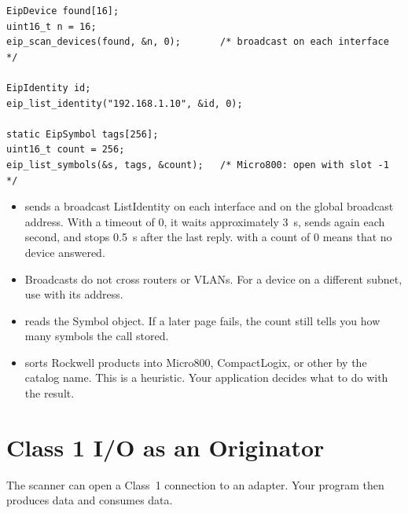 \begin{lstlisting}
EipDevice found[16];
uint16_t n = 16;
eip_scan_devices(found, &n, 0);       /* broadcast on each interface */

EipIdentity id;
eip_list_identity("192.168.1.10", &id, 0);

static EipSymbol tags[256];
uint16_t count = 256;
eip_list_symbols(&s, tags, &count);   /* Micro800: open with slot -1 */
\end{lstlisting}

\begin{itemize}
  \item {} sends a broadcast ListIdentity on each
        interface and on the global broadcast address. With a timeout of 0, it
        waits approximately 3~s, sends again each second, and stops 0.5~s
        after the last reply.  with a count of 0 means that no
        device answered.
  \item Broadcasts do not cross routers or VLANs. For a device on a different
        subnet, use  with its address.
  \item {} reads the Symbol object. If a later page
        fails, the count still tells you how many symbols the call stored.
  \item {} sorts Rockwell products into Micro800,
        CompactLogix, or other by the catalog name. This is a heuristic.
        Your application decides what to do with the result.
\end{itemize}

\section{Class 1 I/O as an Originator}\label{sec:originator}

The scanner can open a Class~1 connection to an adapter. Your program then
produces \OT{} data and consumes \TO{} data.

